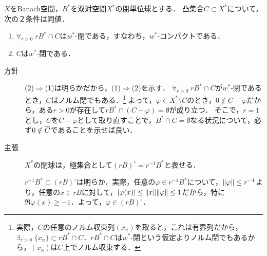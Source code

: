 \documentclass[uplatex,dvipdfmx]{jsreport}
\begin{document}
\begin{theorem}
    $X$をBanach空間，$B^*$を双対空間$X^*$の閉単位球とする．
    凸集合$C\subset X^*$について，次の２条件は同値．
    \begin{enumerate}
        \item $\forall_{r>0}\;rB^*\cap C$は$w^*$-閉である，すなわち，$w^*$-コンパクトである．
        \item $C$は$w^*$-閉である．
    \end{enumerate}
\end{theorem}
\begin{Proof}\mbox{}
    \begin{description}
        \item[方針] (2)$\Rightarrow$(1)は明らかだから，(1)$\Rightarrow$(2)を示す．
        $\forall_{r>0}\;rB^*\cap C$が$w^*$-閉であるとき，$C$はノルム閉でもある．\footnote{実際，$C$の任意のノルム収束列$(x_n)$を取ると，これは有界列だから，$\exists_{r>0}\;\{x_n\}\subset rB^*\cap C$．$rB^*\cap C$は$w^*$-閉という仮定よりノルム閉でもあるから，$(x_n)$は$C$上でノルム収束する．}
        よって，$\varphi\in X^*\setminus C$のとき，$0\notin C-\varphi$だから，ある$r>0$が存在して$rB^*\cap(C-\varphi)=\emptyset$が成り立つ．
        そこで，$r=1$とし，$C$を$C-\varphi$として取り直すことで，$B^*\cap C=\emptyset$なる状況について，必ず$0\notin\overline{C}$であることを示せば良い．
        \item[主張] $X^*$の閉球は，極集合として$(rB)^\circ=r^{-1}B^*$と表せる．
        
        $r^{-1}B^*\subset(rB)^\circ$は明らか．実際，任意の$\varphi\in r^{-1}B^*$について，$\|\varphi\|\le r^{-1}$より，任意の$x\in rB$に対して，$\lvert\varphi(x)\rvert\le\|x\|\|\varphi\|\le1$だから，特に$\Re\varphi(x)\ge-1$．よって，$\varphi\in(rB)^\circ$．


\end{description}
\end{Proof}
\end{document}
